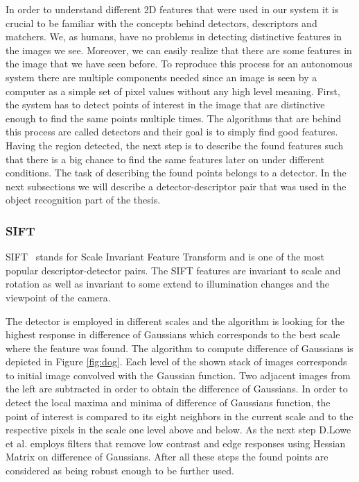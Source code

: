 In order to understand different 2D features that were used in our system it is crucial to be familiar with the concepts behind detectors, descriptors and matchers. We, as humans, have no problems in detecting distinctive features in the images we see. Moreover, we can easily realize that there are some features in the image that we have seen before. To reproduce this process for an autonomous system there are multiple components needed since an image is seen by a computer as a simple set of pixel values without any high level meaning. First, the system has to detect points of interest in the image that are distinctive enough to find the same points multiple times. The algorithms that are behind this process are called detectors and their goal is to simply find good features. Having the region detected, the next step is to describe the found features such that there is a big chance to find the same features later on under different conditions. The task of describing the found points belongs to a detector. In the next subsections we will describe a detector-descriptor pair that was used in the object recognition part of the thesis.

\subsubsection{SIFT}
SIFT~\cite{lowe2004distinctive} stands for Scale Invariant Feature Transform and is one of the most popular descriptor-detector pairs. The SIFT features are invariant to scale and rotation as well as invariant to some extend to illumination changes and the viewpoint of the camera.  

The detector is employed in different scales and the algorithm is looking for the highest response in difference of Gaussians which corresponds to the best scale where the feature was found. The algorithm to compute difference of Gaussians is depicted in Figure \ref{fig:dog}. Each level of the shown stack of images corresponds to initial image convolved with the Gaussian function. Two adjacent images from the left are subtracted in order to obtain the difference of Gaussians. In order to detect the local maxima and minima of difference of Gaussians function, the point of interest is compared to its eight neighbors in the current scale and to the respective pixels in the scale one level above and below. As the next step D.Lowe et al. employs filters that remove low contrast and edge responses using Hessian Matrix on difference of Gaussians. After all these steps the found points are considered as being robust enough to be further used.

